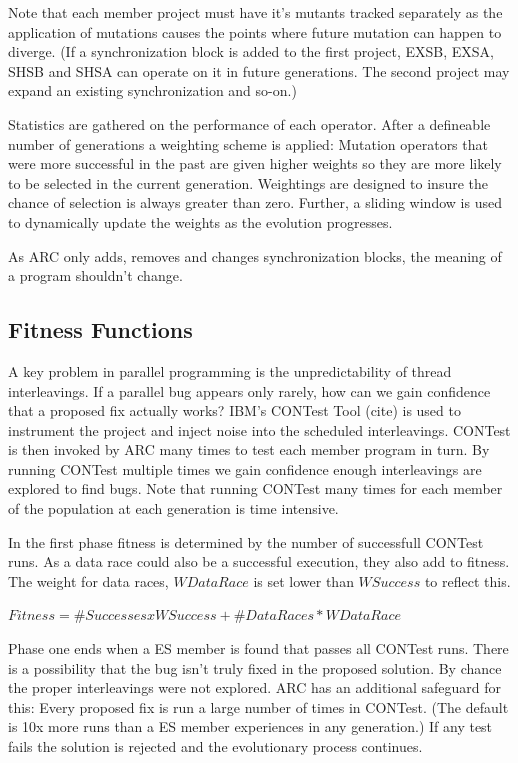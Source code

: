 \documentclass[10pt, conference, compsocconf]{IEEEtran}
\begin{document}
Note that each member project must have it's mutants tracked separately as the application of mutations causes the points where future mutation can happen to diverge.  (If a synchronization block is added to the first project, EXSB, EXSA, SHSB and SHSA can operate on it in future generations. The second project may expand an existing synchronization and so-on.)

Statistics are gathered on the performance of each operator.  After a defineable number of generations a weighting scheme is applied:  Mutation operators that were more successful in the past are given higher weights so they are more likely to be selected in the current generation.  Weightings are designed to insure the chance of selection is always greater than zero.  Further, a sliding window is used to dynamically update the weights as the evolution progresses.

As ARC only adds, removes and changes synchronization blocks, the meaning of a program shouldn't change. 


\subsection{Fitness Functions}
\label{sec:funcfitnessfunctions}

A key problem in parallel programming is the unpredictability of thread interleavings.  If a parallel bug appears only rarely, how can we gain confidence that a proposed fix actually works?  IBM's CONTest Tool (cite) is used to instrument the project and inject noise into the scheduled interleavings.  CONTest is then invoked by ARC many times to test each member program in turn.  By running CONTest multiple times we gain confidence enough interleavings are explored to find bugs. Note that running CONTest many times for each member of the population at each generation is time intensive.

In the first phase fitness is determined by the number of successfull CONTest runs. As a data race could also be a successful execution, they also add to fitness. The weight for data races, $WDataRace$ is set lower than $WSuccess$ to reflect this. 

\begin{center}
$Fitness = \# Successes x WSuccess + \# Data Races * WDataRace$ 
\end{center}

Phase one ends when a ES member is found that passes all CONTest runs. There is a possibility that the bug isn't truly fixed in the proposed solution.  By chance the proper interleavings were not explored.  ARC has an additional safeguard for this:  Every proposed fix is run a large number of times in CONTest. (The default is 10x more runs than a ES member experiences in any generation.) If any test fails the solution is rejected and the evolutionary process continues.
\end{document}
